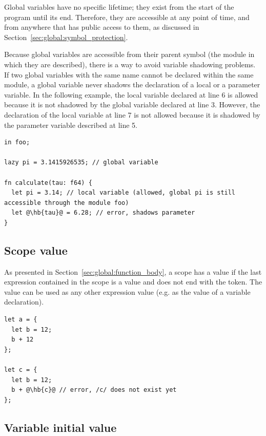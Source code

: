 Global variables have no specific lifetime; they exist from the start of the
program until its end. Therefore, they are accessible at any point of time, and
from anywhere that has public access to them, as discussed in
Section~\ref{sec:global:symbol_protection}.

Because global variables are accessible from their parent symbol (the module in
which they are described), there is a way to avoid variable shadowing problems.
If two global variables with the same name cannot be declared within the same
module, a global variable never shadows the declaration of a local or a
parameter variable. In the following example, the local variable 
declared at line 6 is allowed because it is not shadowed by the global variable
declared at line 3. However, the declaration of the local variable 
at line 7 is not allowed because it is shadowed by the parameter variable
described at line 5.

\begin{lstlisting}[style=coloredverbatimError, escapechar=@]
in foo;

lazy pi = 3.1415926535; // global variable

fn calculate(tau: f64) {
  let pi = 3.14; // local variable (allowed, global pi is still accessible through the module foo)
  let @\hb{tau}@ = 6.28; // error, shadows parameter
}

\end{lstlisting}

\subsection{Scope value}

As presented in Section~\ref{sec:global:function_body}, a scope has a value if the last
expression contained in the scope is a value and does not end with the \token{;}
token. The value can be used as any other expression value (e.g. as the value of
a variable declaration).

\begin{lstlisting}[style=coloredverbatimError, escapechar=@]
let a = {
  let b = 12;
  b + 12
};

let c = {
  let b = 12;
  b + @\hb{c}@ // error, /c/ does not exist yet
};
\end{lstlisting}

\subsection{Variable initial value}
\label{sec:memory:variable_init_value}

